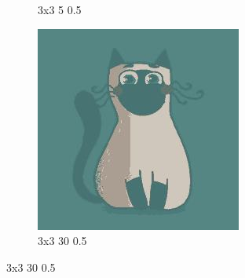 \documentclass[12pt,a4paper]{article}
\begin{document}
\begin{figure}[htb]
\begin{subfigure}{0.25\textwidth}
  \caption{3x3 5 0.5}
  \label{fig:2}
\end{subfigure}\hfil %
\begin{subfigure}{0.25\textwidth}
  \includegraphics[width=\linewidth]{images/cartoon/3-3-30-05}
  \caption{3x3 30 0.5}
  \label{fig:3}
\end{subfigure}


\end{figure}
\end{document}
